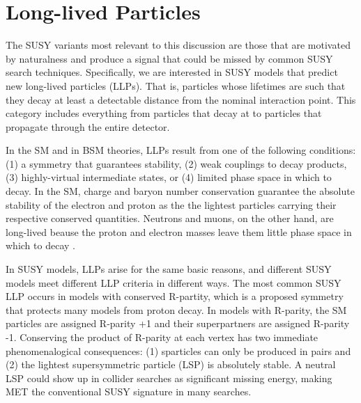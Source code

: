 \documentclass[12pt]{article}
\begin{document}
\section{Long-lived Particles}
    The SUSY variants most relevant to this discussion are those that are motivated by naturalness and  produce a signal that could be missed by common SUSY search techniques. Specifically, we are interested in SUSY models that predict new long-lived particles (LLPs).  That is, particles whose lifetimes are such that they decay at least a detectable distance from the nominal interaction point. This category includes everything from particles that decay at  to particles that propagate through the entire detector. 

    In the SM and in BSM theories, LLPs result from one of the following conditions: (1) a symmetry that guarantees stability, (2) weak couplings to decay products, (3) highly-virtual intermediate states, or (4) limited phase space in which to decay. In the SM, charge and baryon number conservation guarantee the absolute stability of the electron and proton as the the lightest particles carrying their respective conserved quantities. Neutrons and muons, on the other hand, are long-lived beause the proton and electron masses leave them little phase space in which to decay . 

    In SUSY models, LLPs arise for the same basic reasons, and different SUSY models meet different LLP criteria in different ways. The most common SUSY LLP occurs in models with conserved R-partity, which is a proposed symmetry that protects many models from proton decay. In models with R-parity, the SM particles are assigned R-parity +1 and their superpartners are assigned R-parity -1. Conserving the product of R-parity at each vertex has two immediate phenomenalogical consequences: (1) sparticles can only be produced in pairs and (2) the lightest supersymmetric particle (LSP) is absolutely stable. A neutral LSP could show up in collider searches as significant missing energy, making MET the conventional SUSY signature in many searches.
\end{document}
